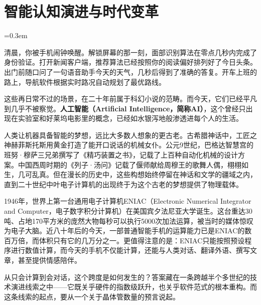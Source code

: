 
\chapter{智能认知演进与时代变革}

\raggedbottom
{}
\emergencystretch=0.3em

清晨，你被手机闹钟唤醒。解锁屏幕的那一刻，面部识别算法在零点几秒内完成了身份验证。打开新闻客户端，推荐算法已经按照你的阅读偏好排列好了今日头条。出门前随口问了一句语音助手今天的天气，几秒后得到了准确的答复。开车上班的路上，导航软件根据实时路况自动规划了最优路线。

这些再日常不过的场景，在二十年前属于科幻小说的范畴。而今天，它们已经平凡到几乎不被察觉。\textbf{人工智能（Artificial Intelligence，简称AI）}，这个曾经只出现在实验室和好莱坞电影里的概念，已经如水银泻地般渗透进每个人的生活。

人类让机器具备智能的梦想，远比大多数人想象的更古老。古希腊神话中，工匠之神赫菲斯托斯用黄金打造了能开口说话的机械女仆。公元9世纪，巴格达智慧宫的班努·穆萨三兄弟撰写了《精巧装置之书》，记载了上百种自动化机械的设计方案。中国西周时期的《列子·汤问》记载了偃师献给周穆王的歌舞人偶，栩栩如生，几可乱真。但在漫长的历史中，这些构想始终停留在神话和文学的疆域之内，直到二十世纪中叶电子计算机的出现终于为这个古老的梦想提供了物理载体。

1946年，世界上第一台通用电子计算机ENIAC（Electronic Numerical Integrator and Computer，电子数字积分计算机）在美国宾夕法尼亚大学诞生。这台重达30吨、占地170平方米的庞然大物每秒可以执行5000次加法运算，被当时的媒体惊叹为电子大脑。近八十年后的今天，一部普通智能手机的运算能力已是ENIAC的数百万倍，而体积只有它的几万分之一。更值得注意的是：ENIAC只能按照预设程序进行数值计算，而今天的手机不仅能计算，还能与人类对话、翻译外语、撰写文章，甚至提供情感陪伴。

从只会计算到会对话，这个跨度是如何发生的？答案藏在一条跨越半个多世纪的技术演进线索之中——它既关乎硬件的指数级跃升，也关乎软件范式的根本重构。而这条线索的起点，要从一个关于晶体管数量的预言说起。

